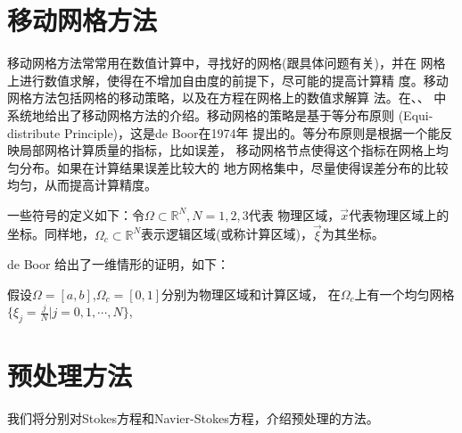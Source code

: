 \section{移动网格方法}
    移动网格方法常常用在数值计算中，寻找好的网格(跟具体问题有关)，并在
    网格上进行数值求解，使得在不增加自由度的前提下，尽可能的提高计算精
    度。移动网格方法包括网格的移动策略，以及在方程在网格上的数值求解算
    法。在\cite{budd2009adaptivity}、\cite{huang2011book}、\cite{tang2007book}
    中系统地给出了移动网格方法的介绍。移动网格的策略是基于等分布原则
    (Equi-distribute Principle)，这是de Boor在1974年\cite{boor1974goodII}
    提出的。等分布原则是根据一个能反映局部网格计算质量的指标，比如误差，
    移动网格节点使得这个指标在网格上均匀分布。如果在计算结果误差比较大的
    地方网格集中，尽量使得误差分布的比较均匀，从而提高计算精度。

    一些符号的定义如下：令$\Omega \subset \mathbb{R}^N, N = 1, 2, 3$代表
    物理区域，$\vec{x}$代表物理区域上的坐标。同样地，$\Omega_c \subset
    \mathbb{R}^N$表示逻辑区域(或称计算区域)，$\vec{\xi}$为其坐标。

        de Boor 给出了一维情形的证明，如下：

    假设$\Omega = [a, b]$,$\Omega_c = [0, 1]$分别为物理区域和计算区域，
    在$\Omega_c$上有一个均匀网格$\{\xi_j = \frac{j}{N}| j = 0, 1, \cdots, N\}$,



\section{预处理方法}
    我们将分别对Stokes方程和Navier-Stokes方程，介绍预处理的方法。
